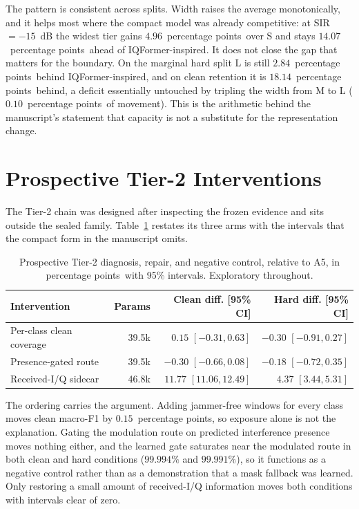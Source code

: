 \documentclass[letterpaper,onecolumn,11pt,journal]{IEEEtran}
\newcommand{\pp}{percentage points}
\begin{document}
The pattern is consistent across splits. Width raises the average
monotonically, and it helps most where the compact model was already
competitive: at SIR $=-15$~dB the widest tier gains $4.96$~\pp\ over S and
stays $14.07$~\pp\ ahead of IQFormer-inspired. It does not close the gap that
matters for the boundary. On the marginal hard split L is still $2.84$~\pp\
behind IQFormer-inspired, and on clean retention it is $18.14$~\pp\ behind,
a deficit essentially untouched by tripling the width from M to L
($0.10$~\pp\ of movement). This is the arithmetic behind the manuscript's
statement that capacity is not a substitute for the representation change.

\section{Prospective Tier-2 Interventions}
The Tier-2 chain was designed after inspecting the frozen evidence and sits
outside the sealed family. Table~\ref{tab:tier2s} restates its three arms with
the intervals that the compact form in the manuscript omits.

\begin{table}[t]
\centering
\caption{Prospective Tier-2 diagnosis, repair, and negative control, relative
to A5, in \pp\ with 95\% intervals. Exploratory throughout.}
\label{tab:tier2s}
\footnotesize
\setlength{\tabcolsep}{2.6pt}
\begin{tabular}{lrrr}
\toprule
Intervention & Params & Clean diff. [95\% CI] & Hard diff. [95\% CI]\\
\midrule
Per-class clean coverage & 39.5k & $0.15$ $[-0.31,0.63]$ & $-0.30$ $[-0.91,0.27]$\\
Presence-gated route & 39.5k & $-0.30$ $[-0.66,0.08]$ & $-0.18$ $[-0.72,0.35]$\\
Received-I/Q sidecar & 46.8k & $11.77$ $[11.06,12.49]$ & $4.37$ $[3.44,5.31]$\\
\bottomrule
\end{tabular}
\end{table}

The ordering carries the argument. Adding jammer-free windows for every class
moves clean macro-F1 by $0.15$~\pp, so exposure alone is not the explanation.
Gating the modulation route on predicted interference presence moves nothing
either, and the learned gate saturates near the modulated route in both clean
and hard conditions ($99.994\%$ and $99.991\%$), so it functions as a negative
control rather than as a demonstration that a mask fallback was learned. Only
restoring a small amount of received-I/Q information moves both conditions with
intervals clear of zero.
\end{document}
